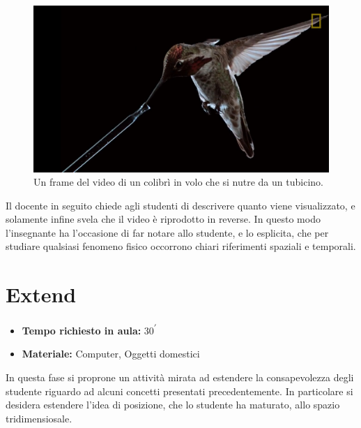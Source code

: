 \documentclass{report} \usepackage[T1]{fontenc} \usepackage[italian]{babel}
\begin{document}
\begin{figure}
\centering
  \includegraphics[width=\textwidth]{Hummingbird}
  \caption{Un frame del video di un colibrì in volo che si nutre da un tubicino.}
  \label{fig:hummingbird}
\end{figure}

Il docente in seguito chiede agli studenti di descrivere quanto viene
visualizzato, e solamente infine svela che il video è riprodotto in
reverse. In questo modo l'insegnante ha l'occasione di far notare
allo studente, e lo esplicita, che per studiare qualsiasi fenomeno fisico
occorrono chiari riferimenti spaziali e temporali.

\section{Extend}
\begin{itemize}
\item \textbf{Tempo richiesto in aula:} 30\textsuperscript{$\prime$}
\item \textbf{Materiale:} Computer, Oggetti domestici
\end{itemize}

In questa fase si proprone un attività mirata ad estendere la consapevolezza
degli studente riguardo ad alcuni concetti presentati precedentemente.
In particolare si desidera estendere l'idea di posizione, che lo studente ha maturato,
allo spazio tridimensiosale.
\end{document}
